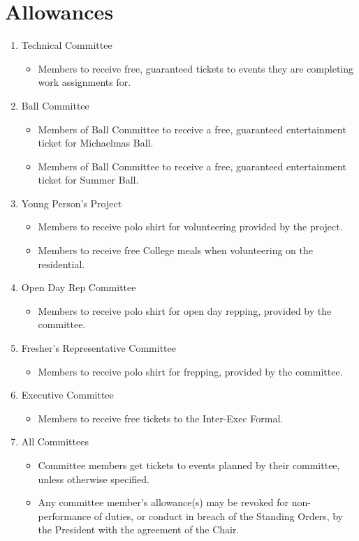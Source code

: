 \documentclass[12pt]{article}
\begin{document}
\section{Allowances}
\begin{enumerate}[]
    \item Technical Committee
    \begin{itemize}     
    \item Members to receive free, guaranteed tickets to events they are completing work assignments for.
    \end{itemize}

\item Ball Committee
    \begin{itemize}     
    \item Members of Ball Committee to receive a free, guaranteed entertainment ticket for Michaelmas Ball.
    \item Members of Ball Committee to receive a free, guaranteed entertainment ticket for Summer Ball.
    \end{itemize}

\item Young Person’s Project
    \begin{itemize}   
    \item Members to receive polo shirt for volunteering provided by the project.
    \item Members to receive free College meals when volunteering on the residential.
    \end{itemize}

\item Open Day Rep Committee
    \begin{itemize}     
    \item Members to receive polo shirt for open day repping, provided by the committee.
    \end{itemize}

\item Fresher’s Representative Committee
    \begin{itemize}     
    \item Members to receive polo shirt for frepping, provided by the committee.
    \end{itemize}

\item Executive Committee
    \begin{itemize}     
    \item Members to receive free tickets to the Inter-Exec Formal.
    \end{itemize}

\item All Committees
    \begin{itemize}
    \item Committee members get tickets to events planned by their committee, unless otherwise specified.
    \item Any committee member’s allowance(s) may be revoked for non-performance of duties, or conduct in breach of     the Standing Orders, by the President with the agreement of the Chair.
    \end{itemize}
    
\end{enumerate}
\end{document}
